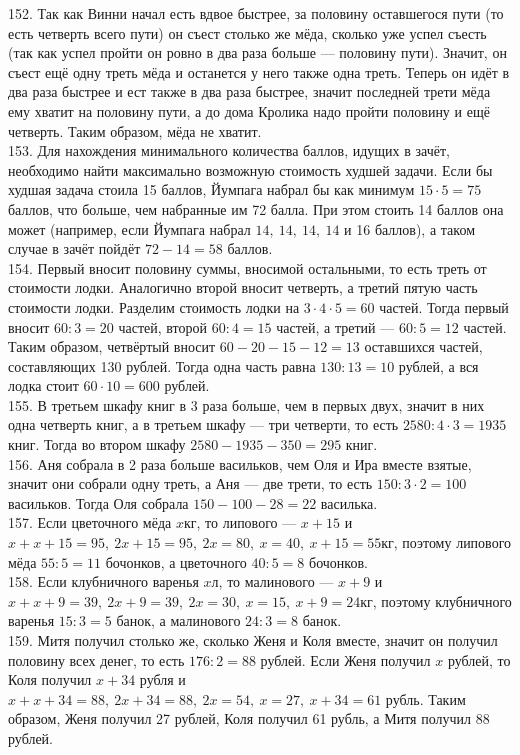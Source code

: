 152. Так как Винни начал есть вдвое быстрее, за половину оставшегося пути (то есть четверть всего пути) он съест столько же мёда, сколько уже успел съесть (так как успел пройти он ровно в два раза больше --- половину пути). Значит, он съест ещё одну треть мёда и останется у него также одна треть. Теперь он идёт в два раза быстрее и ест также в два раза быстрее, значит последней трети мёда ему хватит на половину пути, а до дома Кролика надо пройти половину и ещё четверть. Таким образом, мёда не хватит.\\
153. Для нахождения минимального количества баллов, идущих в зачёт, необходимо найти максимально возможную стоимость худшей задачи. Если бы худшая задача стоила 15 баллов, Йумпага набрал бы как минимум $15\cdot5=75$ баллов, что больше, чем набранные им 72 балла. При этом стоить 14 баллов она может (например, если Йумпага набрал $14,\ 14,\ 14,\ 14$ и 16 баллов), а таком случае в зачёт пойдёт $72-14=58$ баллов.\\
154. Первый вносит половину суммы, вносимой остальными, то есть треть от стоимости лодки. Аналогично второй вносит четверть, а третий пятую часть стоимости лодки.
Разделим стоимость лодки на $3\cdot4\cdot5=60$ частей. Тогда первый вносит $60:3=20$ частей, второй $60:4=15$ частей, а третий --- $60:5=12$ частей. Таким образом, четвёртый вносит $60-20-15-12=13$ оставшихся частей, составляющих 130 рублей. Тогда одна часть равна $130:13=10$ рублей, а вся лодка стоит $60\cdot10=600$ рублей.\\
155. В третьем шкафу книг в 3 раза больше, чем в первых двух, значит в них одна четверть книг, а в третьем шкафу --- три четверти, то есть $2580:4\cdot3=1935$ книг. Тогда во втором шкафу $2580-1935-350=295$ книг.\\
156. Аня собрала в 2 раза больше васильков, чем Оля и Ира вместе взятые, значит они собрали одну треть, а Аня --- две трети, то есть $150:3\cdot2=100$ васильков. Тогда Оля собрала $150-100-28=22$ василька.\\
157. Если цветочного мёда $x$кг, то липового --- $x+15$ и $x+x+15=95,\ 2x+15=95,\ 2x=80,\ x=40,\ x+15=55$кг, поэтому липового мёда $55:5=11$ бочонков, а цветочного $40:5=8$ бочонков.\\
158. Если клубничного варенья $x$л, то малинового --- $x+9$ и $x+x+9=39,\ 2x+9=39,\ 2x=30,\ x=15,\ x+9=24$кг, поэтому клубничного варенья $15:3=5$ банок, а малинового $24:3=8$ банок.\\
159. Митя получил столько же, сколько Женя и Коля вместе, значит он получил половину всех денег, то есть $176:2=88$ рублей. Если Женя получил $x$ рублей, то Коля получил $x+34$ рубля и  $x+x+34=88,\ 2x+34=88,\ 2x=54,\ x=27,\ x+34=61$ рубль. Таким образом, Женя получил 27 рублей, Коля получил 61 рубль, а Митя получил 88 рублей.\\
